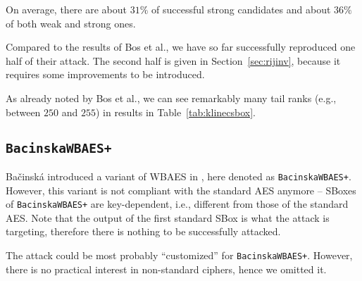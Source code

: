 	On average, there are about $31\%$ of successful strong candidates and about $36\%$ of both weak and strong ones.
	
	Compared to the results of Bos et al., we have so far successfully reproduced one half of their attack. The second half is given in Section~\ref{sec:rijinv}, because it requires some improvements to be introduced.
	
	\begin{note}
	\label{note:tailrank}
		As already noted by Bos et al., we can see remarkably many tail ranks (e.g., between $250$ and $255$) in results in Table~\ref{tab:klinecsbox}.
	\end{note}



\subsection{\tt BacinskaWBAES+}
\label{sec:bacinskawbaes}

Bačinská introduced a variant of WBAES in \cite{bacinska2015white}, here denoted as {\tt BacinskaWBAES+}. However, this variant is not compliant with the standard AES anymore -- SBoxes of {\tt BacinskaWBAES+} are key-dependent, i.e., different from those of the standard AES. Note that the output of the first standard SBox is what the attack is targeting, therefore there is nothing to be successfully attacked.

The attack could be most probably ``customized'' for {\tt BacinskaWBAES+}. However, there is no practical interest in non-standard ciphers, hence we omitted it.